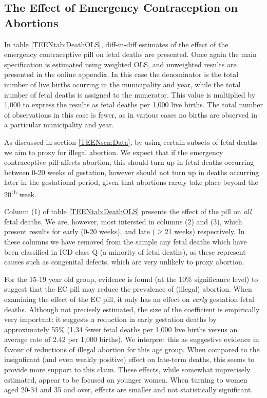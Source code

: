 \subsection{The Effect of Emergency Contraception on Abortions}
\label{TEENsscn:rabortion}
In table \ref{TEENtab:DeathOLS}, diff-in-diff estimates of the effect of the
emergency contraceptive pill on fetal deaths are presented.  Once again the main
specification is estimated using weighted OLS, and unweighted results are
presented in the online appendix. In this case the denominator is the total
number of live births ocurring in the municipality and year, while the total
number of fetal deaths is assigned to the numerator.  This value is multiplied
by 1,000 to express the results as fetal deaths per 1,000 live births. The total
number of observations in this case is fewer, as in various cases no births are
observed in a particular municipality and year.

As discussed in section \ref{TEENscn:Data}, by using certain subsets of fetal
deaths we aim to proxy for illegal abortion.  We expect that if the emergency
contraceptive pill affects abortion, this should turn up in fetal deaths
occurring between 0-20 weeks of gestation, however should not turn up in deaths
occurring later in the gestational period, given that abortions rarely take
place beyond the 20\textsuperscript{th} week.

Column (1) of table \ref{TEENtab:DeathOLS} presents the effect of the pill on
\emph{all} fetal deaths.  We are, however, most intersted in columns (2) and (3),
which present results for early (0-20 weeks), and late ($\geq$21 weeks) 
respectively.  In these columns we have removed from the sample any fetal deaths
which have been classified in ICD class Q (a minority of fetal deaths), as these 
represent causes such as congenital defects, which are very unlikely to proxy
abortion.

For the 15-19 year old group, evidence is found (at the 10\% significance level)
to suggest that the EC pill may reduce the prevalence of (illegal) abortion.
When examining the effect of the EC pill, it only has an effect on \emph{early}
gestation fetal deaths.  Although not precisely estimated, the size of the
coefficient is empirically very important: it suggests a reduction in early
gestation deaths by approximately 55\% (1.34 fewer fetal deaths per 1,000 live
births versus an average rate of 2.42 per 1,000 births). We interpret this as
suggestive evidence in favour of reductions of illegal abortion for this age
group.  When compared to the insignficant (and even weakly positive) effect on
late-term deaths, this seems to provide more support to this claim.  These
effects, while somewhat imprecisely estimated, appear to be focused on younger
women. When turning to women aged 20-34 and 35 and over, effects are smaller
and not statistically significant.

